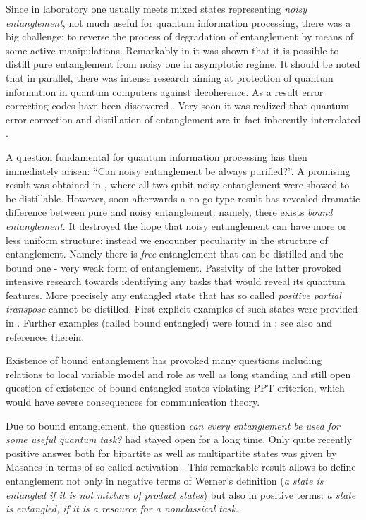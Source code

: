 \documentclass[rmp,12pt,preprint]{revtex4-2}
\begin{document}
Since in laboratory one usually meets mixed states representing {\it
  noisy entanglement}, not much useful for quantum information
processing, there was a big challenge: to reverse the process of
degradation of entanglement by means of some active manipulations.
Remarkably in \cite{BBPSSW1996} it was shown that it is possible to
distill pure entanglement from noisy one in asymptotic regime. It
should be noted that in parallel, there was intense research aiming at
protection of quantum information in quantum computers against
decoherence. As a result error correcting codes have been discovered
\cite{Shor,Steane-codes-prl}. Very soon it was realized that quantum
error correction and distillation of entanglement are in fact
inherently interrelated \cite{BDSW1996}.

A question fundamental for quantum information processing has then
immediately arisen: ``Can noisy entanglement be always purified?''. A
promising result was obtained in \cite{HHH1997-distill}, where all
two-qubit noisy entanglement were showed to be distillable. However,
soon afterwards a no-go type result \cite{bound} has revealed dramatic
difference between pure and noisy entanglement: namely, there exists
{\it bound entanglement}. It destroyed the hope that noisy
entanglement can have more or less uniform structure: instead we
encounter peculiarity in the structure of entanglement. Namely there
is {\it free} entanglement that can be distilled and the bound one -
very weak form of entanglement. Passivity of the latter provoked
intensive research towards identifying any tasks that would reveal its
quantum features. More precisely any entangled state that has so
called {\it positive partial transpose} cannot be distilled. First
explicit examples of such states were provided in
\cite{Pawel97}. Further examples (called bound entangled) were found
in \cite{BrussPeres2000, BennettUPBI1999,WernerWolf}; see also
\cite{DagBook,ClarissePhd} and references therein.


Existence of bound entanglement has provoked many questions including
relations to local variable model and role as well as long standing
and still open question of existence of bound entangled states
violating PPT criterion, which would have severe consequences for
communication theory.

Due to bound entanglement, the question {\it can every entanglement be
used for some useful quantum task?} had stayed open for a long
time. Only quite recently positive answer both for bipartite as well
as multipartite states was given by Masanes
\cite{Masanes1_activation,Masanes-multiactiv} in terms of so-called
activation \cite{activation}. This remarkable result allows to define
entanglement not only in negative terms of Werner's definition ({\it a
  state is entangled if it is not mixture of product states}) but also
in positive terms: {\it a state is entangled, if it is a resource for
  a nonclassical task}.
\end{document}
